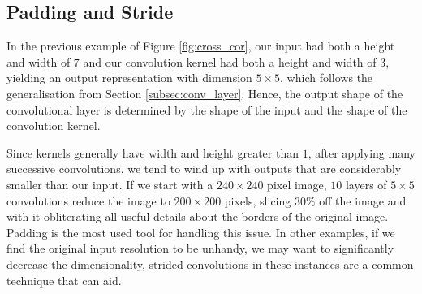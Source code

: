 \documentclass[12pt]{report}
\numberwithin{equation}{section}
\begin{document}
\subsection{Padding and Stride}
In the previous example of Figure \ref{fig:cross_cor}, our input had both a height and width of $7$ and our convolution kernel had both a height and width of $3$, yielding an output representation with dimension $5 \times 5$, which follows the generalisation from Section \ref{subsec:conv_layer}.
Hence, the output shape of the convolutional layer is determined by the shape of the input and the shape of the convolution kernel. 

Since kernels generally have width and height greater than $1$, after applying many successive convolutions, we tend to wind up with outputs that are considerably smaller than our input. If we start with a $240\times 240$ pixel image, $10$ layers of $5 \times 5$ convolutions reduce the image to $200 \times 200$ pixels, slicing $30\%$ off the image and with it obliterating all useful details about the borders of the original image. Padding is the most used tool for handling this issue. In other examples, if we find the original input resolution to be unhandy, we may want to significantly decrease the dimensionality, strided convolutions in these instances are a common technique that can aid.
\end{document}

